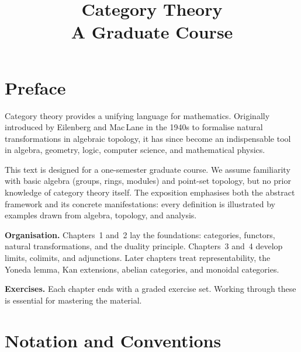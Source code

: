 \documentclass[a4paper,12pt]{book}
\title{\Huge\textbf{Category Theory}\\[0.5em]
       \Large A Graduate Course}
\author{}
\date{}
\theoremstyle{definition}
\theoremstyle{plain}
\theoremstyle{remark}
\begin{document}

\maketitle
\dominitoc
\tableofcontents

\chapter*{Preface}\label{ch:preface}

Category theory provides a unifying language for mathematics.  Originally
introduced by Eilenberg and Mac\,Lane in the 1940s to formalise natural
transformations in algebraic topology, it has since become an
indispensable tool in algebra, geometry, logic, computer science, and
mathematical physics.

This text is designed for a one-semester graduate course.  We assume
familiarity with basic algebra (groups, rings, modules) and point-set
topology, but no prior knowledge of category theory itself.  The
exposition emphasises both the abstract framework and its concrete
manifestations: every definition is illustrated by examples drawn from
algebra, topology, and analysis.

\medskip
\noindent\textbf{Organisation.}
Chapters~1 and~2 lay the foundations: categories, functors, natural
transformations, and the duality principle.
Chapters~3 and~4 develop limits, colimits, and adjunctions.
Later chapters treat representability, the Yoneda lemma, Kan extensions,
abelian categories, and monoidal categories.

\medskip
\noindent\textbf{Exercises.}
Each chapter ends with a graded exercise set.  Working through these
is essential for mastering the material.

\chapter*{Notation and Conventions}\label{ch:notation}
\end{document}
